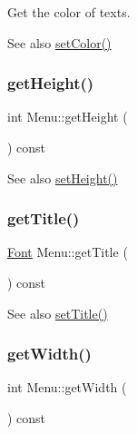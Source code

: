 Get the color of texts. 

\begin{DoxySeeAlso}{See also}
\mbox{\hyperlink{class_menu_a5e8e5869de44c9c592780bbebed30be5}{set\+Color()}} 
\end{DoxySeeAlso}
\mbox{\label{class_menu_a67f414acad54c237dc321a28b6ca723a}} 
\subsubsection{\texorpdfstring{get\+Height()}{getHeight()}}
{\footnotesize\ttfamily int Menu\+::get\+Height (\begin{DoxyParamCaption}{ }\end{DoxyParamCaption}) const}

\begin{DoxySeeAlso}{See also}
\mbox{\hyperlink{class_menu_a54f1e7a7bb1cd809477f8e8b2e578366}{set\+Height()}} 
\end{DoxySeeAlso}
\mbox{\label{class_menu_a5e5ab9761f37464740171acef5f53ad6}} 
\subsubsection{\texorpdfstring{get\+Title()}{getTitle()}}
{\footnotesize\ttfamily \mbox{\hyperlink{class_font}{Font}} Menu\+::get\+Title (\begin{DoxyParamCaption}{ }\end{DoxyParamCaption}) const}

\begin{DoxySeeAlso}{See also}
\mbox{\hyperlink{class_menu_a5ec641fded3a140c8a5522ad689a301c}{set\+Title()}} 
\end{DoxySeeAlso}
\mbox{\label{class_menu_a993d925b955146c9e265d16df1371f51}} 
\subsubsection{\texorpdfstring{get\+Width()}{getWidth()}}
{\footnotesize\ttfamily int Menu\+::get\+Width (\begin{DoxyParamCaption}{ }\end{DoxyParamCaption}) const}

